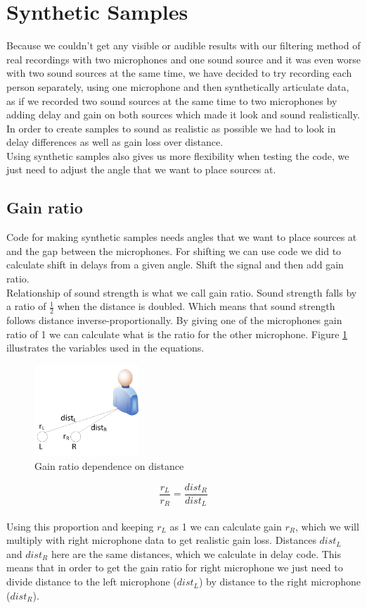 \section{Synthetic Samples}
  Because we couldn't get any visible or audible results with our filtering method of real recordings with two 
microphones and one sound source and it was even worse with two sound sources at the same time, we have 
decided to try recording each person separately, using one microphone and then synthetically articulate data, 
as if we recorded two sound sources at the same time to two microphones by adding delay and gain on both 
sources which made it look and sound realistically.\\
  In order to create samples to sound as realistic as possible we had to look in delay differences as well as 
gain loss over distance. \\
Using synthetic samples also gives us more flexibility when testing the code, we just need to adjust the 
angle that we want to place sources at. 
  \subsection{Gain ratio}
  Code for making synthetic samples needs angles that we want to place sources at and the gap between the 
microphones. For shifting we can use code we did to calculate shift in delays from a given angle. Shift the signal 
and then add gain ratio. \\
  Relationship of sound strength is what we call gain ratio. Sound strength falls by a ratio of \( \frac{1}{2}
\) when the distance is doubled. Which means that sound strength follows distance inverse-proportionally. 
  By giving one of the microphones gain ratio of 1 we can calculate what is the ratio for the other 
microphone. Figure \ref{fig:ratioDependence} illustrates the variables used in the equations.
\begin{figure}[htp]
	\centering
	\includegraphics[width=0.35\textwidth]{Illustrations/gainRatio.jpg}
	\caption{Gain ratio dependence on distance}
	\label{fig:ratioDependence}
\end{figure}
 \[\frac{r_L}{r_R} = \frac{dist_R}{dist_L} \]\\
Using this proportion and keeping \(r_L\) as 1 we can calculate gain \(r_R\), which we will multiply with 
right microphone data to get realistic gain loss. Distances \(dist_L\) and \(dist_R\) here are the same 
distances, which we calculate in delay code. This means that in order to get the gain ratio for right 
microphone we just need to divide distance to the left microphone (\(dist_L\)) by distance to the right 
microphone (\(dist_R\)).
